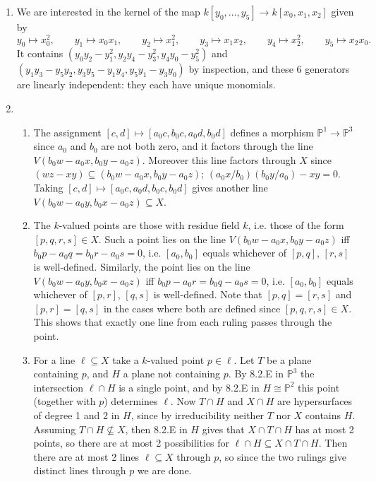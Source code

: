 \documentclass{report}
\renewcommand{\P}{\mathbb{P}} %
\begin{document}
\begin{enumerate}[label=\textbf{8.2.\Alph*.}]
	\item We are interested in the kernel of the map
	      $k[y_0,\ldots,y_5]\to k[x_0,x_1,x_2]$ given by
	      \begin{equation*}
		      y_0 \mapsto x_0^2,\qquad
		      y_1 \mapsto x_0x_1,\qquad
		      y_2 \mapsto x_1^2,\qquad
		      y_3 \mapsto x_1x_2,\qquad
		      y_4 \mapsto x_2^2,\qquad
		      y_5 \mapsto x_2x_0.
	      \end{equation*}
	      It contains $(y_0y_2-y_1^2,y_2y_4-y_3^2,y_4y_0-y_5^2)$ and
	      $(y_1y_3-y_5y_2,y_3y_5-y_1y_4,y_5y_1-y_3y_0)$ by inspection, and these
	      6 generators are linearly independent: they each have unique monomials.

	\item
	      \begin{enumerate}[label=(\alph*)]
		      \item The assignment $[c,d]\mapsto[a_0c,b_0c,a_0d,b_0d]$ defines a
		            morphism $\P^1\to\P^3$ since $a_0$ and $b_0$ are not both zero,
		            and it factors through the line $V(b_0w-a_0x,b_0y-a_0z)$.
		            Moreover this line factors through $X$ since
		            $(wz-xy)\subseteq(b_0w-a_0x,b_0y-a_0z)$;
		            $(a_0x/b_0)(b_0y/a_0)-xy=0$. Taking
		            $[c,d]\mapsto[a_0c,a_0d,b_0c,b_0d]$ gives another line
		            $V(b_0w-a_0y,b_0x-a_0z)\subseteq X$.

		      \item The $k$-valued points are those with residue field $k$, i.e.
		            those of the form $[p,q,r,s]\in X$. Such a point lies on the
		            line $V(b_0w-a_0x,b_0y-a_0z)$ iff $b_0p-a_0q=b_0r-a_0s=0$, i.e.
		            $[a_0,b_0]$ equals whichever of $[p,q]$, $[r,s]$ is well-defined.
		            Similarly, the point lies on the line $V(b_0w-a_0y,b_0x-a_0z)$
		            iff $b_0p-a_0r=b_0q-a_0s=0$, i.e. $[a_0,b_0]$ equals whichever
		            of $[p,r]$, $[q,s]$ is well-defined. Note that $[p,q]=[r,s]$ and
		            $[p,r]=[q,s]$ in the cases where both are defined since
		            $[p,q,r,s]\in X$. This shows that exactly one line from each
		            ruling passes through the point.

		      \item For a line $\ell\subseteq X$ take a $k$-valued point
		            $p\in\ell$. Let $T$ be a plane containing $p$, and $H$ a plane
		            not containing $p$. By 8.2.E in $\P^3$ the intersection
		            $\ell\cap H$ is a single point, and by 8.2.E in $H\cong\P^2$
		            this point (together with $p$) determines $\ell$. Now $T\cap H$
		            and $X\cap H$ are hypersurfaces of degree 1 and 2 in $H$, since
		            by irreducibility neither $T$ nor $X$ contains $H$. Assuming
		            $T\cap H\not\subseteq X$, then 8.2.E in $H$ gives that
		            $X\cap T\cap H$ has at most 2 points, so there are at most 2
		            possibilities for $\ell\cap H\subseteq X\cap T\cap H$. Then
		            there are at most 2 lines $\ell\subseteq X$ through $p$, so
		            since the two rulings give distinct lines through $p$ we are
		            done.


\end{enumerate}
\end{enumerate}
\end{document}
